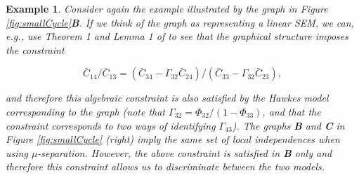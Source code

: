 \documentclass[accepted]{uai2021} %
\newtheorem{exmp}[thm]{Example}
\begin{document}
\begin{exmp}
	\label{exmp:eqSmallCycle}
	Consider again the example illustrated by the graph in Figure 
	\ref{fig:smallCycle}\textbf{B}. If we think of the graph as representing a 
	linear SEM, we can, e.g., use Theorem 1 and Lemma 1 of \cite{chen2014} to 
	see that the graphical structure imposes the constraint 
	
	$$\bar{C}_{14}/\bar{C}_{13} = (\bar{C}_{34} - 
	\Gamma_{32}\bar{C}_{24})/(\bar{C}_{33} - 
	\Gamma_{32}\bar{C}_{23}),$$ 
	
	and 
	therefore this algebraic constraint is also satisfied by the Hawkes model 
	corresponding to the graph (note that $\Gamma_{32} = 
	\Phi_{32}/(1-\Phi_{33})$, and that the constraint 
	corresponds to
	two ways of identifying $\Gamma_{43}$). The graphs \textbf{B} and 
	\textbf{C} in Figure 
	\ref{fig:smallCycle} (right) 
	imply the same set of local independences
	when using $\mu$-separation. However, the above constraint is satisfied in 
	\textbf{B} only and therefore this constraint allows us to 
	discriminate between the two models.
\end{exmp}
\end{document}
